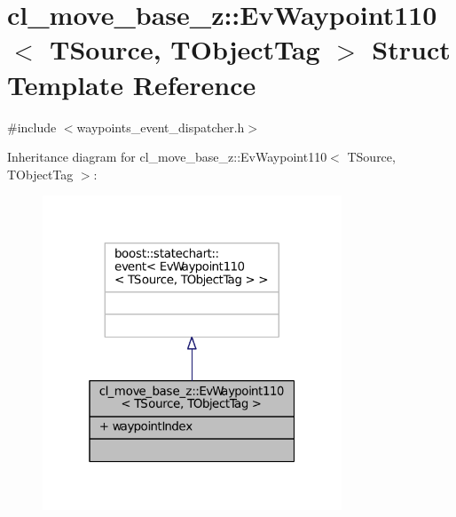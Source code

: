 \hypertarget{structcl__move__base__z_1_1EvWaypoint110}{}\section{cl\+\_\+move\+\_\+base\+\_\+z\+:\+:Ev\+Waypoint110$<$ T\+Source, T\+Object\+Tag $>$ Struct Template Reference}
\label{structcl__move__base__z_1_1EvWaypoint110}


{\ttfamily \#include $<$waypoints\+\_\+event\+\_\+dispatcher.\+h$>$}



Inheritance diagram for cl\+\_\+move\+\_\+base\+\_\+z\+:\+:Ev\+Waypoint110$<$ T\+Source, T\+Object\+Tag $>$\+:
\nopagebreak
\begin{figure}[H]
\begin{center}
\leavevmode
\includegraphics[width=253pt]{structcl__move__base__z_1_1EvWaypoint110__inherit__graph}
\end{center}
\end{figure}


